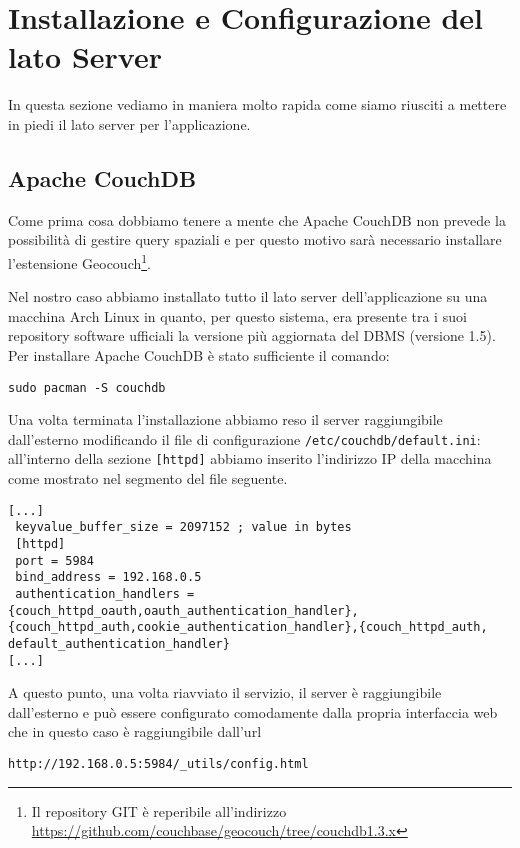 \chapter{Installazione e Configurazione del lato Server}

    In questa sezione vediamo in maniera molto rapida come siamo riusciti a
    mettere in piedi il lato server per l'applicazione.


    \section{Apache CouchDB\texttrademark{}}

        Come prima cosa dobbiamo tenere a mente che Apache
        CouchDB\texttrademark{} non prevede la possibilità di gestire query
        spaziali e per questo motivo sarà necessario installare l'estensione
        Geocouch\footnote{Il repository GIT è reperibile all'indirizzo
        \url{https://github.com/couchbase/geocouch/tree/couchdb1.3.x}}.

        Nel nostro caso abbiamo installato tutto il lato server
        dell'applicazione su una macchina Arch Linux in quanto, per questo
        sistema, era presente tra i suoi repository software ufficiali la
        versione più aggiornata del DBMS (versione 1.5). Per installare Apache
        CouchDB\texttrademark{} è stato sufficiente il comando:
        \begin{lstlisting}[language=plane]
 sudo pacman -S couchdb
        \end{lstlisting}

        Una volta terminata l'installazione abbiamo reso
        il server raggiungibile dall'esterno modificando il file di
        configurazione \texttt{/etc/couchdb/default.ini}: all'interno della
        sezione \verb|[httpd]| abbiamo inserito l'indirizzo IP della macchina
        come mostrato nel segmento del file seguente.
        \begin{lstlisting}[language=plane]
[...]
 keyvalue_buffer_size = 2097152 ; value in bytes
 [httpd]
 port = 5984
 bind_address = 192.168.0.5
 authentication_handlers = {couch_httpd_oauth,oauth_authentication_handler},{couch_httpd_auth,cookie_authentication_handler},{couch_httpd_auth, default_authentication_handler}
[...]
        \end{lstlisting}
        A questo punto, una volta riavviato il servizio, il server è
        raggiungibile dall'esterno e può essere configurato comodamente dalla
        propria interfaccia web che in questo caso è raggiungibile dall'url
        \begin{lstlisting}[language=plane]
 http://192.168.0.5:5984/_utils/config.html
        \end{lstlisting}


